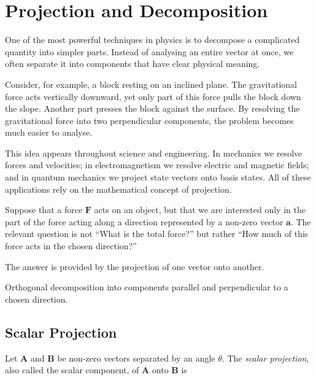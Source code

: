 
\section{Projection and Decomposition}
\label{sec:vector-projection-decomposition}

One of the most powerful techniques in physics is to decompose a complicated
quantity into simpler parts. Instead of analysing an entire vector at once, we
often separate it into components that have clear physical meaning.

Consider, for example, a block resting on an inclined plane. The gravitational
force acts vertically downward, yet only part of this force pulls the block
down the slope. Another part presses the block against the surface. By resolving
the gravitational force into two perpendicular components, the problem becomes
much easier to analyse.

This idea appears throughout science and engineering. In mechanics we resolve
forces and velocities; in electromagnetism we resolve electric and magnetic
fields; and in quantum mechanics we project state vectors onto basis states.
All of these applications rely on the mathematical concept of projection.


Suppose that a force $\mathbf F$ acts on an object, but that we are interested
only in the part of the force acting along a direction represented by a non-zero
vector $\mathbf a$. The relevant question is not ``What is the total force?''
but rather ``How much of this force acts in the chosen direction?''

The answer is provided by the projection of one vector onto another.

\begin{bookfigure}{Orthogonal decomposition into components parallel and perpendicular to a chosen direction.}

\end{bookfigure}

\subsection{Scalar Projection}

Let $\mathbf A$ and $\mathbf B$ be non-zero vectors separated by an angle
$\theta$. The \emph{scalar projection}, also called the scalar component, of
$\mathbf A$ onto $\mathbf B$ is

